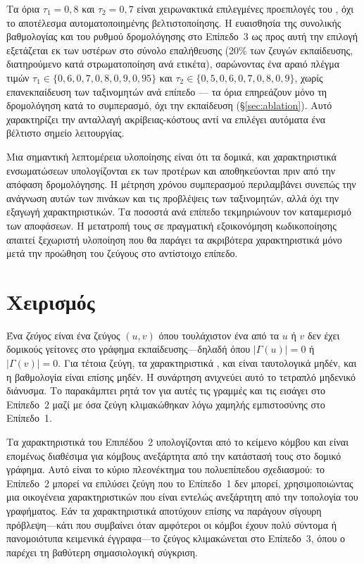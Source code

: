 Τα όρια $\tau_1 = 0{,}8$ και $\tau_2 = 0{,}7$ είναι χειρωνακτικά επιλεγμένες
προεπιλογές του \texttt{}, όχι το αποτέλεσμα αυτοματοποιημένης
βελτιστοποίησης.
Η ευαισθησία της συνολικής βαθμολογίας  και του
ρυθμού δρομολόγησης στο Επίπεδο~3 ως προς αυτή την επιλογή εξετάζεται εκ των υστέρων στο
σύνολο επαλήθευσης (20\% των ζευγών εκπαίδευσης, διατηρούμενο κατά στρωματοποίηση
ανά ετικέτα), σαρώνοντας ένα αραιό πλέγμα τιμών $\tau_1 \in \{0{,}6, 0{,}7, 0{,}8,
0{,}9, 0{,}95\}$ και $\tau_2 \in \{0{,}5, 0{,}6, 0{,}7, 0{,}8, 0{,}9\}$, χωρίς
επανεκπαίδευση των ταξινομητών ανά επίπεδο --- τα όρια επηρεάζουν μόνο τη
δρομολόγηση κατά το συμπερασμό, όχι την εκπαίδευση (\S\ref{sec:ablation}). Αυτό
χαρακτηρίζει την ανταλλαγή ακρίβειας-κόστους αντί να επιλέγει αυτόματα ένα
βέλτιστο σημείο λειτουργίας.

Μια σημαντική λεπτομέρεια υλοποίησης είναι ότι τα δομικά,  και
χαρακτηριστικά ενσωματώσεων υπολογίζονται εκ των προτέρων και αποθηκεύονται πριν από την
απόφαση δρομολόγησης.
Η μέτρηση χρόνου συμπερασμού περιλαμβάνει συνεπώς την
ανάγνωση αυτών των πινάκων και τις προβλέψεις των ταξινομητών, αλλά όχι την
εξαγωγή χαρακτηριστικών.
Τα ποσοστά ανά επίπεδο τεκμηριώνουν τον καταμερισμό των
αποφάσεων.
Η μετατροπή τους σε πραγματική εξοικονόμηση κωδικοποίησης απαιτεί
ξεχωριστή υλοποίηση που θα παράγει τα ακριβότερα χαρακτηριστικά μόνο μετά την
προώθηση του ζεύγους στο αντίστοιχο επίπεδο.


\section{Χειρισμός }
\label{sec:cold-start}

Ένα \textit{ζεύγος } είναι ένα ζεύγος $(u, v)$ όπου
τουλάχιστον ένα από τα $u$ ή $v$ δεν έχει δομικούς γείτονες στο γράφημα
εκπαίδευσης---δηλαδή όπου $|\Gamma(u)| = 0$ ή $|\Gamma(v)| = 0$.
Για τέτοια ζεύγη,
τα χαρακτηριστικά ,  και  είναι
ταυτολογικά μηδέν, και η βαθμολογία  είναι επίσης μηδέν.
Η συνάρτηση \texttt{} ανιχνεύει αυτό το
τετραπλό μηδενικό διάνυσμα.
Το  παρακάμπτει ρητά τον
 για αυτές τις γραμμές και τις εισάγει στο Επίπεδο~2
μαζί με όσα ζεύγη κλιμακώθηκαν λόγω χαμηλής εμπιστοσύνης στο Επίπεδο~1.

Τα χαρακτηριστικά  του Επιπέδου~2 υπολογίζονται από το κείμενο κόμβου και
είναι επομένως διαθέσιμα για κόμβους  ανεξάρτητα από την
κατάστασή τους στο δομικό γράφημα.
Αυτό είναι το κύριο πλεονέκτημα του πολυεπίπεδου
σχεδιασμού: το Επίπεδο~2 μπορεί να επιλύσει ζεύγη  που το
Επίπεδο~1 δεν μπορεί, χρησιμοποιώντας μια οικογένεια χαρακτηριστικών που είναι
εντελώς ανεξάρτητη από την τοπολογία του γραφήματος.
Εάν τα χαρακτηριστικά 
αποτύχουν επίσης να παράγουν σίγουρη πρόβλεψη---κάτι που συμβαίνει όταν αμφότεροι
οι κόμβοι έχουν πολύ σύντομα ή πανομοιότυπα κειμενικά έγγραφα---το ζεύγος κλιμακώνεται
στο Επίπεδο~3, όπου ο  παρέχει τη βαθύτερη σημασιολογική
σύγκριση.

